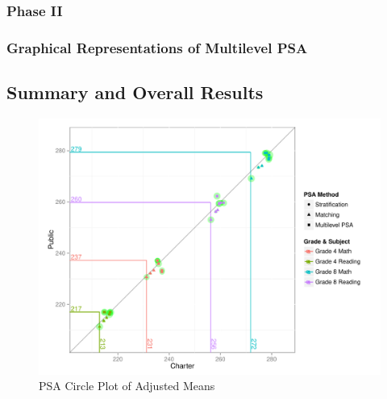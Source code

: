 \documentclass[letterpaper,12p,twoside]{article} %
\begin{document}
{\subsubsection{Phase II}

%

\subsubsection{Graphical Representations of Multilevel PSA}



\subsection{Summary and Overall Results}

\begin{figure}[ht]
\begin{center}
\includegraphics[width=\textwidth]{../Figures2009/OverallScatter.pdf}
\caption{PSA Circle Plot of Adjusted Means}
\label{fig:overallcirc}
\end{center}
\end{figure}



}
\end{document}
